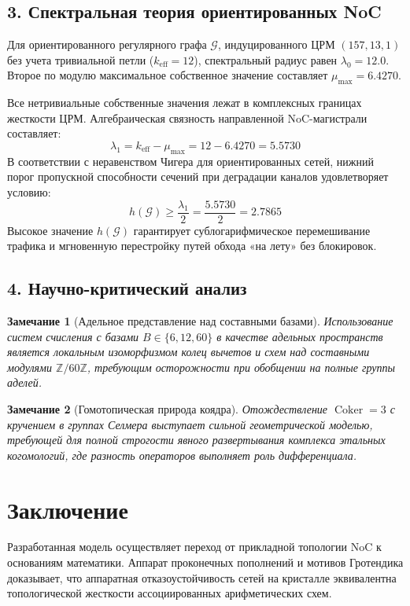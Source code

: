\documentclass[10pt,twocolumn]{article}
\DeclareMathOperator{\Coker}{Coker}
\newtheorem{criticism}{Замечание}
\begin{document}
\subsection*{3. Спектральная теория ориентированных NoC}
Для ориентированного регулярного графа $\mathcal{G}$, индуцированного ЦРМ $(157, 13, 1)$ без учета тривиальной петли ($k_{\text{eff}} = 12$), спектральный радиус равен $\lambda_0 = 12.0$. Второе по модулю максимальное собственное значение составляет $\mu_{\text{max}} = 6.4270$. 

Все нетривиальные собственные значения лежат в комплексных границах жесткости ЦРМ. Алгебраическая связность направленной NoC-магистрали составляет:
\begin{equation}
\lambda_1 = k_{\text{eff}} - \mu_{\text{max}} = 12 - 6.4270 = 5.5730
\end{equation}
В соответствии с неравенством Чигера для ориентированных сетей, нижний порог пропускной способности сечений при деградации каналов удовлетворяет условию:
\begin{equation}
h(\mathcal{G}) \ge \frac{\lambda_1}{2} = \frac{5.5730}{2} = 2.7865
\end{equation}
Высокое значение $h(\mathcal{G})$ гарантирует сублогарифмическое перемешивание трафика и мгновенную перестройку путей обхода «на лету» без блокировок.

\subsection*{4. Научно-критический анализ}
\begin{criticism}[Адельное представление над составными базами]
Использование систем счисления с базами $B \in \{6, 12, 60\}$ в качестве адельных пространств является локальным изоморфизмом колец вычетов и схем над составными модулями $\mathbb{Z}/60\mathbb{Z}$, требующим осторожности при обобщении на полные группы аделей.
\end{criticism}

\begin{criticism}[Гомотопическая природа коядра]
Отождествление $\Coker = 3$ с кручением в группах Селмера выступает сильной геометрической моделью, требующей для полной строгости явного развертывания комплекса этальных когомологий, где разность операторов выполняет роль дифференциала.
\end{criticism}

\section*{Заключение}
Разработанная модель осуществляет переход от прикладной топологии NoC к основаниям математики. Аппарат проконечных пополнений и мотивов Гротендика доказывает, что аппаратная отказоустойчивость сетей на кристалле эквивалентна топологической жесткости ассоциированных арифметических схем.
\end{document}
